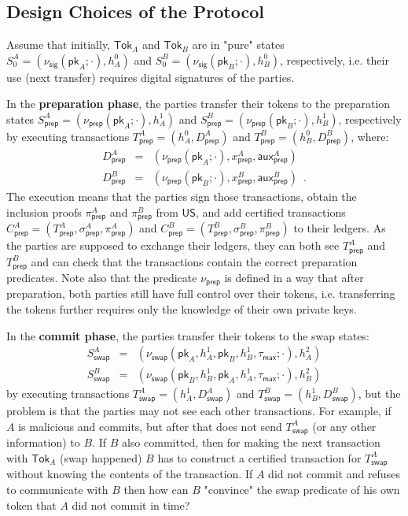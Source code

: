 \documentclass{article}
\newcommand{\pubkey}[0]{\mathsf{pk}}
\newcommand{\unisrv}[0]{\mathsf{US}}
\begin{document}
\subsection{Design Choices of the Protocol}

Assume that initially, $\mathsf{Tok}_A$ and $\mathsf{Tok}_B$ are in "pure" states
$S^A_0=(\nu_\mathsf{sig}(\pubkey_A;\cdot), h^0_A)$ and
$S^B_0=(\nu_\mathsf{sig}(\pubkey_B;\cdot),h^0_B)$, respectively, i.e. their use (next transfer) requires digital signatures of the parties. \medskip

\noindent In the \textbf{preparation phase}, the parties transfer their tokens to the preparation states $S^A_\mathsf{prep}=(\nu_\mathsf{prep}(\pubkey_A;\cdot),h^1_A)$ and $S^B_\mathsf{prep}=(\nu_\mathsf{prep}(\pubkey_B;\cdot),h^1_B)$, respectively by executing transactions $T^A_\mathsf{prep}=(h^0_A, D^A_\mathsf{prep})$ and
$T^B_\mathsf{prep}=(h^0_B, D^B_\mathsf{prep})$,
where:
\begin{eqnarray*}
D^A_\mathsf{prep}&=&(\nu_\mathsf{prep}(\pubkey_A;\cdot),x^A_\mathsf{prep},\mathsf{aux}^A_\mathsf{prep})\\
D^B_\mathsf{prep}&=&(\nu_\mathsf{prep}(\pubkey_B;\cdot),x^B_\mathsf{prep},\mathsf{aux}^B_\mathsf{prep})\enspace.
\end{eqnarray*}
The execution means that the parties sign those transactions, obtain the inclusion proofs $\pi^A_\mathsf{prep}$ and $\pi^B_\mathsf{prep}$ from $\unisrv$, and add certified transactions $C^A_\mathsf{prep}=(T^A_\mathsf{prep},\sigma^A_\mathsf{prep},\pi^A_\mathsf{prep})$ and $C^B_\mathsf{prep}=(T^B_\mathsf{prep},\sigma^B_\mathsf{prep},\pi^B_\mathsf{prep})$ to their ledgers. As the parties are supposed to exchange their ledgers, they can both see $T^A_\mathsf{prep}$ and $T^B_\mathsf{prep}$ and can check that the transactions contain the correct preparation predicates. Note also that the predicate $\nu_\mathsf{prep}$ is defined in a way that after preparation, both parties still have full control over their tokens, i.e. transferring the tokens further requires only the knowledge of their own private keys.
\medskip

\noindent In the \textbf{commit phase}, the parties transfer their tokens to the swap states:
\begin{eqnarray*}
S^A_\mathsf{swap}&=&(\nu_\mathsf{swap}(\pubkey_A,h^1_A,\pubkey_B,h^1_B,\tau_\mathsf{max};\cdot),h^2_A)\\
S^B_\mathsf{swap}&=&(\nu_\mathsf{swap}(\pubkey_B,h^1_B,\pubkey_A,h^1_A,\tau_\mathsf{max};\cdot),h^2_B)
\end{eqnarray*}
by executing transactions $T^A_\mathsf{swap}=(h^1_A, D^A_\mathsf{swap})$ and
$T^B_\mathsf{swap}=(h^1_B, D^B_\mathsf{swap})$, but the problem is that the parties may not see each other transactions. For example, if $A$ is malicious and commits, but after that does not send $T^A_\mathsf{swap}$ (or any other information)
to $B$. If $B$ also committed, then for making the next transaction with $\mathsf{Tok}_A$ (swap happened) $B$ has to construct a certified transaction for $T^A_\mathsf{swap}$ without knowing
the contents of the transaction. If $A$ did not commit and refuses to communicate with $B$ then how can $B$ "convince" the swap predicate of his own token that $A$ did not commit in time?
\end{document}

